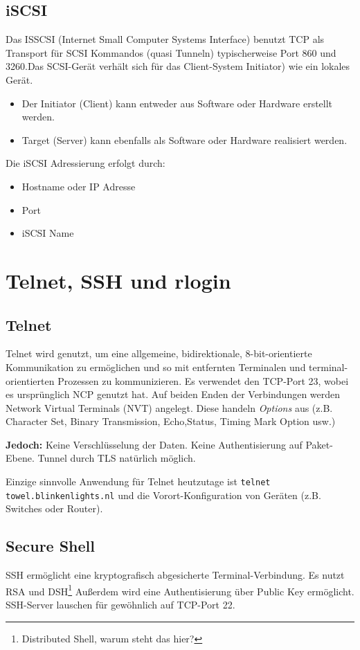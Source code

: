 \documentclass{article} %
\begin{document}
\subsection{iSCSI}
Das ISSCSI (Internet Small Computer Systems Interface)\cite{rfc3720} benutzt TCP als Transport für SCSI Kommandos (quasi Tunneln)  typischerweise Port 860 und 3260.Das SCSI-Gerät verhält sich für das Client-System Initiator) wie ein lokales Gerät.
	\begin{itemize}
	\item Der Initiator (Client) kann entweder aus Software oder Hardware erstellt werden. 
	\item Target (Server) kann ebenfalls als Software oder Hardware realisiert werden. 
	\end{itemize}
Die iSCSI Adressierung erfolgt durch:
	\begin{itemize}
	\item Hostname oder IP Adresse 
	\item Port 
	\item iSCSI Name
	\end{itemize}


\section{Telnet, SSH und rlogin}
\subsection{Telnet}
Telnet wird genutzt, um eine allgemeine, bidirektionale, 8-bit-orientierte Kommunikation zu ermöglichen und so mit entfernten Terminalen und terminal-orientierten Prozessen zu kommunizieren.
Es verwendet den TCP-Port 23, wobei es ursprünglich NCP genutzt hat.
Auf beiden Enden der Verbindungen werden Network Virtual Terminals (NVT) angelegt.
Diese handeln \emph{Options} aus (z.B. Character Set, Binary Transmission, Echo,Status, Timing Mark Option usw.)

\textbf{Jedoch: } Keine Verschlüsselung der Daten. Keine Authentisierung
auf Paket-Ebene. Tunnel durch TLS natürlich möglich.

Einzige sinnvolle Anwendung für Telnet heutzutage ist \texttt{telnet towel.blinkenlights.nl} und die Vorort-Konfiguration von Geräten (z.B. Switches oder Router).
\subsection{Secure Shell}
SSH\cite{rfc4251} ermöglicht eine kryptografisch abgesicherte Terminal-Verbindung.
Es nutzt RSA und DSH\footnote{Distributed Shell, warum steht das hier?}
Außerdem wird eine Authentisierung über Public Key ermöglicht.
SSH-Server lauschen für gewöhnlich auf TCP-Port 22.
\end{document}
